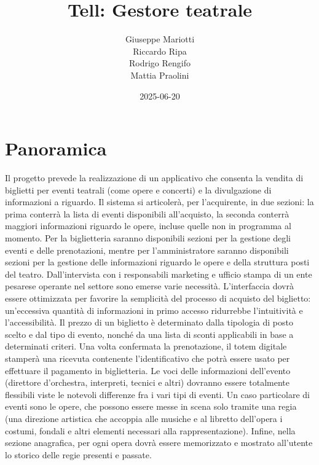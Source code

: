 \documentclass{article}
\title{Tell: Gestore teatrale}
\date{2025-06-20}
\author
{
    Giuseppe Mariotti \\
    Riccardo Ripa \\
    Rodrigo Rengifo \\
    Mattia Praolini
}
\begin{document}
    \maketitle
    \newpage

    \section{Panoramica}
        Il progetto prevede la realizzazione di un applicativo che consenta la vendita di biglietti per eventi teatrali (come opere e concerti) e la divulgazione di informazioni a riguardo. Il sistema si articolerà, per l’acquirente, in due sezioni: la prima conterrà la lista di eventi disponibili all'acquisto, la seconda conterrà maggiori informazioni riguardo le opere, incluse quelle non in programma al momento. Per la biglietteria saranno disponibili sezioni per la gestione degli eventi e delle prenotazioni, mentre per l'amministratore saranno disponibili sezioni per la gestione delle informazioni riguardo le opere e della struttura posti del teatro. Dall’intervista con i responsabili marketing e ufficio stampa di un ente pesarese operante nel settore sono emerse varie necessità. L’interfaccia dovrà essere ottimizzata per favorire la semplicità del processo di acquisto del biglietto: un’eccessiva quantità di informazioni in primo accesso ridurrebbe l’intuitività e l’accessibilità. Il prezzo di un biglietto è determinato dalla tipologia di posto scelto e dal tipo di evento, nonché da una lista di sconti applicabili in base a determinati criteri. Una volta confermata la prenotazione, il totem digitale stamperà una ricevuta contenente l'identificativo che potrà essere usato per effettuare il pagamento in biglietteria. Le voci delle informazioni dell’evento (direttore d’orchestra, interpreti, tecnici e altri) dovranno essere totalmente flessibili viste le notevoli differenze fra i vari tipi di eventi. Un caso particolare di eventi sono le opere, che possono essere messe in scena solo tramite una regia (una direzione artistica che accoppia alle musiche e al libretto dell’opera i costumi, fondali e altri elementi necessari alla rappresentazione). Infine, nella sezione anagrafica, per ogni opera dovrà essere memorizzato e mostrato all’utente lo storico delle regie presenti e passate.
    \newpage
\end{document}

